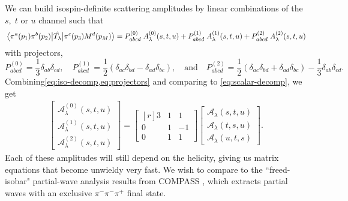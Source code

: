 \documentclass[10pt, aps,prd,amsmath,amssymb,superscriptaddress,onecolumn,
nofootinbib,showpacs,preprintnumbers]{revtex4-1}
\begin{document}
We can build isospin-definite scattering amplitudes by linear combinations of the \(s, \; t \text{ or } u\) channel such that
	\begin{equation}\label{eq:iso-decomp}
	  \mel{\pi^a(p_1)\pi^b(p_2)}{\hat{T_\lambda}}{\pi^c(p_3)M^d(p_M)} = P^{(0)}_{abcd} \; A_\lambda^{(0)}(s,t,u) + P^{(1)}_{abcd}  \; A_\lambda^{(1)}(s,t,u) +  P^{(2)}_{abcd} \; A_\lambda^{(2)}(s,t,u)
	\end{equation}
with projectors,
	\begin{equation} \label{eq:projectors}
	P^{(0)}_{abcd} = \frac{1}{3}\delta_{ab}\delta_{cd},  \quad P^{(1)}_{abcd} = \frac{1}{2}(\delta_{ac}\delta_{bd}-\delta_{ad}\delta_{bc}),  \quad \textrm{and} \quad   P^{(2)}_{abcd} = \frac{1}{2}
	(\delta_{ac}\delta_{bd} + \delta_{ad}\delta_{bc}) - \frac{1}{3} \delta_{ab}\delta_{cd}.
	\end{equation}
Combining\cref{eq:iso-decomp,eq:projectors} and comparing to \cref{eq:scalar-decomp}, we get
    \begin{align} \label{eq:matrix}
      \begin{bmatrix}
      \mathcal{A}_\lambda^{(0)}(s,t,u) \\ \mathcal{A}_\lambda^{(1)} (s,t,u) \\ \mathcal{A}_\lambda^{(2)}(s,t,u)
      \end{bmatrix}
    =
      \begin{bmatrix*}[r]
        3 & 1 & 1 \\ 	0 & 1 & -1 \\ 0 & 1 & 1
      \end{bmatrix*}
      \begin{bmatrix}
      \mathcal{A}_\lambda(s,t,u) \\ \mathcal{A}_\lambda(t,s,u) \\ \mathcal{A}_\lambda(u,t,s)
      \end{bmatrix}.
    \end{align}
 Each of these amplitudes will still depend on the helicity, giving us matrix equations that become unwieldy very fast. We wish to compare to the ``freed-isobar" partial-wave analysis results from COMPASS \cite{COMPASS-Swave,Krinner:2017vch}, which extracts partial waves with an exclusive \(\pi^-\pi^-\pi^+\) final state.
\end{document}
